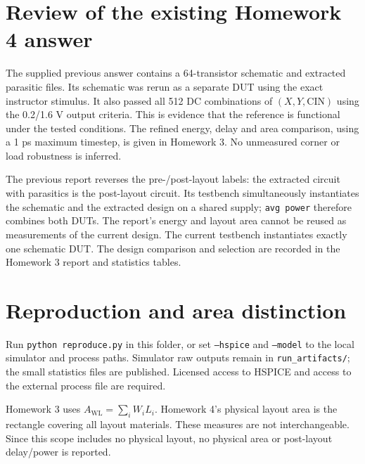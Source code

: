 \documentclass[10pt,a4paper]{article}
\begin{document}
\section{Review of the existing Homework 4 answer}
The supplied previous answer contains a 64-transistor schematic and extracted
parasitic files. Its schematic was rerun as a separate DUT using the exact
instructor stimulus. It also passed all 512 DC combinations of
$(X,Y,\mathrm{CIN})$ using the 0.2/1.6 V output criteria. This is evidence that
the reference is functional under the tested conditions. The refined energy,
delay and area comparison, using a 1 ps maximum timestep, is given in Homework 3.
No unmeasured corner or load robustness is inferred.

The previous report reverses the pre-/post-layout labels: the extracted circuit
with parasitics is the post-layout circuit. Its testbench simultaneously
instantiates the schematic and the extracted design on a shared supply;
\texttt{avg power} therefore combines both DUTs. The report's energy and
layout area cannot be reused as measurements of the current design. The current
testbench instantiates exactly one schematic DUT. The design comparison and
selection are recorded in the Homework 3 report and statistics tables.

\section{Reproduction and area distinction}
Run \texttt{python reproduce.py} in this folder, or set \texttt{--hspice} and
\texttt{--model} to the local simulator and process paths. Simulator raw outputs
remain in \texttt{run\_artifacts/}; the small statistics files are published.
Licensed access to HSPICE and access to the external process file are required.

Homework 3 uses $A_{\mathrm{WL}}=\sum_i W_iL_i$. Homework 4's physical layout
area is the rectangle covering all layout materials. These measures are not
interchangeable. Since this scope includes no physical layout, no physical
area or post-layout delay/power is reported.
\end{document}
